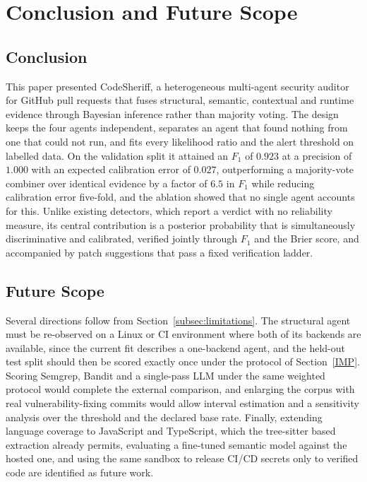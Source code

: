 \documentclass[conference]{IEEEtran}
\begin{document}
\section{Conclusion and Future Scope} \label{CON}

\subsection{Conclusion}
This paper presented CodeSheriff, a heterogeneous multi-agent security
auditor for GitHub pull requests that fuses structural, semantic,
contextual and runtime evidence through Bayesian inference rather than
majority voting. The design keeps the four agents independent, separates an
agent that found nothing from one that could not run, and fits every
likelihood ratio and the alert threshold on labelled data. On the
validation split it attained an $F_1$ of $0.923$ at a precision of $1.000$
with an expected calibration error of $0.027$, outperforming a
majority-vote combiner over identical evidence by a factor of $6.5$ in
$F_1$ while reducing calibration error five-fold, and the ablation showed
that no single agent accounts for this. Unlike existing detectors, which
report a verdict with no reliability measure, its central contribution is a
posterior probability that is simultaneously discriminative and calibrated,
verified jointly through $F_1$ and the Brier score, and accompanied by
patch suggestions that pass a fixed verification ladder.

\subsection{Future Scope}
Several directions follow from Section~\ref{subsec:limitations}. The
structural agent must be re-observed on a Linux or CI environment where
both of its backends are available, since the current fit describes a
one-backend agent, and the held-out test split should then be scored
exactly once under the protocol of Section~\ref{IMP}. Scoring Semgrep,
Bandit and a single-pass LLM under the same weighted protocol would
complete the external comparison, and enlarging the corpus with real
vulnerability-fixing commits would allow interval estimation and a
sensitivity analysis over the threshold and the declared base rate.
Finally, extending language coverage to JavaScript and TypeScript, which
the tree-sitter based extraction already permits, evaluating a fine-tuned
semantic model against the hosted one, and using the same sandbox to
release CI/CD secrets only to verified code are identified as future work.

\balance
{}


\end{document}
